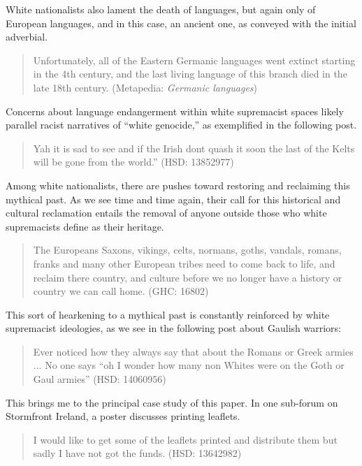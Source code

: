 \documentclass[output=paper,colorlinks,citecolor=brown]{langscibook}
\begin{document}
\noindent {} White nationalists also lament the death of languages, but again only of European languages, and in this case, an ancient one, as conveyed with the initial adverbial.

\begin{quote}
Unfortunately, all of the Eastern Germanic languages went extinct starting in the 4th century, and the last living language of this branch died in the late 18th century. (Metapedia: \emph{Germanic languages}) 
\end{quote}

\noindent Concerns about language endangerment within white supremacist spaces likely parallel racist narratives of ``white genocide,'' as exemplified in the following post.

\begin{quote}
Yah it is sad to see and if the Irish dont quash it soon the last of the Kelts will be gone from the world.'' (HSD: 13852977) 
\end{quote}

\noindent Among  white nationalists, there are pushes toward restoring and reclaiming this mythical past. As we see time and time again, their call for this historical and cultural reclamation entails the removal of anyone outside those who white supremacists define as their heritage.

\begin{quote}
\sloppy
The Europeans Saxons, vikings, celts, normans, goths, vandals, romans, franks and many other European tribes need to come back to life, and reclaim there country, and culture before we no longer have a history or country we can call home. (GHC: 16802) 
\end{quote}

\noindent This sort of hearkening to a mythical past is constantly reinforced by white supremacist ideologies, as we see in the following post about Gaulish warriors:

\begin{quote}
Ever noticed how they always say that about the Romans or Greek armies ... No one says ``oh I wonder how many non Whites were on the Goth or Gaul armies'' (HSD: 14060956) 
\end{quote}

\noindent This brings me to the principal case study of this paper. In one sub-forum on Stormfront Ireland, a poster discusses printing leaflets.

\begin{quote}
I would like to get some of the leaflets printed and distribute them but sadly I have not got the funds. (HSD: 13642982) 
\end{quote}
\end{document}
